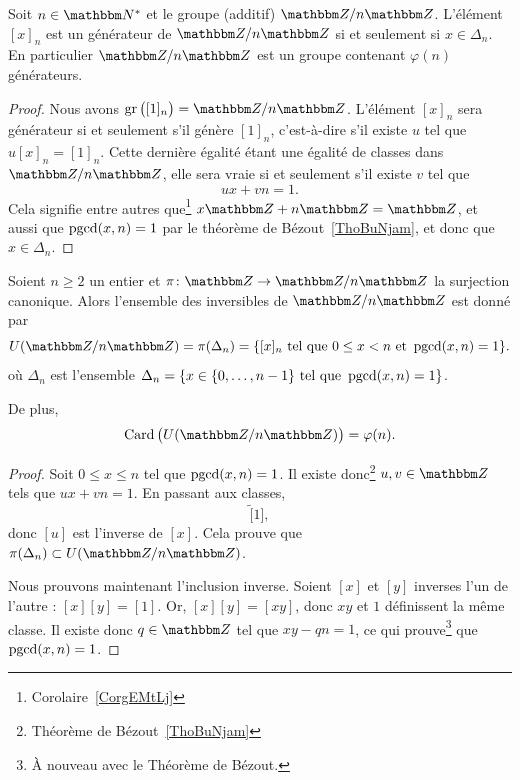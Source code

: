 \begin{proposition}     \label{PropZnmuphiGensn}
    Soit \( n\in\eN^*\) et le groupe (additif) \( \eZ/n\eZ\). L'élément \( [x]_n\) est un générateur de \( \eZ/n\eZ\) si et seulement si \( x\in \Delta_n\). En particulier \( \eZ/n\eZ\) est un groupe contenant \( \varphi(n)\) générateurs.
\end{proposition}

\begin{proof}
    Nous avons \( \gr\big( [1]_n \big)=\eZ/n\eZ\). L'élément \( [x]_n\) sera générateur si et seulement s'il génère \( [1]_n \), c'est-à-dire s'il existe \( u\) tel que \( u[x]_n=[1]_n\). Cette dernière égalité étant une égalité de classes dans \( \eZ/n\eZ\), elle sera vraie si et seulement s'il existe \( v\) tel que
    \begin{equation}
        ux+vn=1.
    \end{equation}
    Cela signifie entre autres que\footnote{Corolaire~\ref{CorgEMtLj}} \( x\eZ+n\eZ=\eZ\), et aussi que \( \operatorname{pgcd}(x,n)=1\) par le théorème de Bézout~\ref{ThoBuNjam}, et donc que \( x\in \Delta_n\).
\end{proof}

\begin{proposition}     \label{PropZpintssiprempUzn}
    Soient \( n\geq 2\) un entier et \( \pi\colon \eZ\to \eZ/n\eZ\) la surjection canonique. Alors l'ensemble des inversibles de \( \eZ/n\eZ\) est donné par
    \begin{equation}
        U(\eZ/n\eZ)=\pi(\Delta_n)=\{ [x]_n \tq 0\leq x < n\text{ et }\pgcd(x,n)=1 \}.
    \end{equation}
    où \( \Delta_n\) est l'ensemble $\Delta_n=\{ x\in\{ 0,\ldots,n-1 \}\text{ tel que }\operatorname{pgcd}(x,n)=1 \}$.

    De plus,
    \begin{equation}
        \Card\big( U(\eZ/n\eZ) \big)=\varphi(n).
    \end{equation}
\end{proposition}

\begin{proof}
    Soit \( 0\leq x\leq n\) tel que \( \operatorname{pgcd}(x,n)=1\). Il existe donc\footnote{Théorème de Bézout~\ref{ThoBuNjam}} \( u,v\in\eZ\) tels que \( ux+vn=1\). En passant aux classes,
    \begin{equation}
        [u][x] \tilde [1],
    \end{equation}
    donc \( [u] \) est l'inverse de \( [x]\). Cela prouve que \( \pi(\Delta_n)\subset U(\eZ/n\eZ)\).

    Nous prouvons maintenant l'inclusion inverse. Soient \( [x] \) et \( [y] \) inverses l'un de l'autre : \( [x][y]=[1] \). Or, \([x][y] = [xy]\), donc \( xy \) et \( 1 \) définissent la même classe. Il existe donc \( q\in\eZ\) tel que \( xy-qn=1\), ce qui prouve\footnote{À nouveau avec le Théorème de Bézout.} que \( \operatorname{pgcd}(x,n)=1\).
\end{proof}

